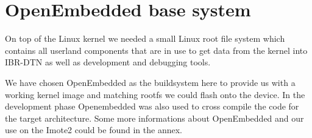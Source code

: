 \section{OpenEmbedded base system}
On top of the Linux kernel we needed a small Linux root file system which
contains all userland components that are in use to get data from the kernel
into IBR-DTN as well as development and debugging tools.

We have chosen OpenEmbedded as the buildsystem here to provide us with a working
kernel image and matching rootfs we could flash onto the device. In the
development phase Openembedded was also used to cross compile the code for the
target architecture. Some more informations about OpenEmbedded and our use on the
Imote2 could be found in the annex.
